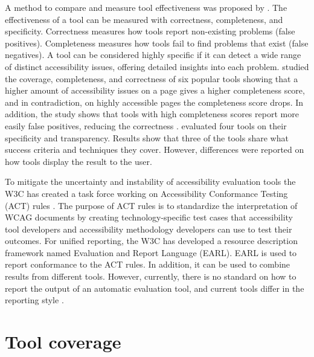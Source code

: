 A method to compare and measure tool effectiveness was proposed by \textcite{Brajnik2004}. The effectiveness of a tool can be measured with correctness, completeness, and specificity. Correctness measures how tools report non-existing problems (false positives). Completeness measures how tools fail to find problems that exist (false negatives). A tool can be considered highly specific if it can detect a wide range of distinct accessibility issues, offering detailed insights into each problem. \textcite{benchmark_aet} studied the coverage, completeness, and correctness of six popular tools showing that a higher amount of accessibility issues on a page gives a higher completeness score, and in contradiction, on highly accessible pages the completeness score drops. In addition, the study shows that tools with high completeness scores report more easily false positives, reducing the correctness \citep{benchmark_aet}. \textcite{tooltransparency} evaluated four tools on their specificity and transparency. Results show that three of the tools share what success criteria and techniques they cover. However, differences were reported on how tools display the result to the user.

To mitigate the uncertainty and instability of accessibility evaluation tools the W3C has created a task force working on Accessibility Conformance Testing (ACT) rules \citep{act_overview}. The purpose of ACT rules is to standardize the interpretation of WCAG documents by creating technology-specific test cases that accessibility tool developers and accessibility methodology developers can use to test their outcomes. For unified reporting, the W3C has developed a resource description framework named Evaluation and Report Language (EARL). EARL is used to report conformance to the ACT rules. In addition, it can be used to combine results from different tools. However, currently, there is no standard on how to report the output of an automatic evaluation tool, and current tools differ in the reporting style \citep{tool_analysis_directive}.

\section{Tool coverage\label{coverage}}

